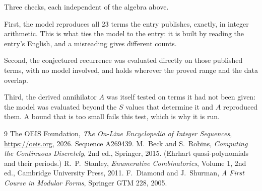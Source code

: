 \documentclass[11pt,a4paper]{article}
\theoremstyle{plain}
\theoremstyle{definition}
\begin{document}
Three checks, each independent of the algebra above.

First, the model reproduces all $23$ terms the entry publishes, exactly, in integer
arithmetic. This is what ties the model to the entry: it is built by reading the entry's
English, and a misreading gives different counts.

Second, the conjectured recurrence was evaluated directly on those published terms, with no
model involved, and holds wherever the proved range and the data overlap.

Third, the derived annihilator $A$ was itself tested on terms it had not been given: the model
was evaluated beyond the $S$ values that determine it and $A$ reproduced them. A bound that is
too small fails this test, which is why it is run.

\begin{thebibliography}{9}
 The OEIS Foundation, \emph{The On-Line Encyclopedia of Integer
Sequences}, \url{https://oeis.org}, 2026. Sequence A269439.
 M.~Beck and S.~Robins, \emph{Computing the Continuous Discretely},
2nd ed., Springer, 2015. (Ehrhart quasi-polynomials and their periods.)
 R.~P.~Stanley, \emph{Enumerative Combinatorics}, Volume 1, 2nd ed.,
Cambridge University Press, 2011.
 F.~Diamond and J.~Shurman, \emph{A First Course in Modular Forms},
Springer GTM 228, 2005.
\end{thebibliography}
\end{document}
